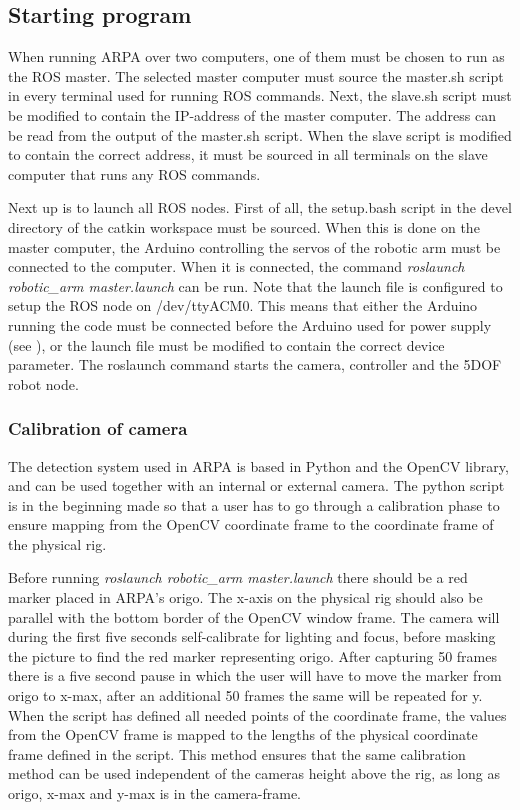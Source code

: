 \documentclass[11pt,a4paper]{report}
\begin{document}
	\subsection{Starting program}
	\label{startup}
	
	When running ARPA over two computers, one of them must be chosen to run as the ROS master. The selected master computer must source the master.sh script in every terminal used for running ROS commands. Next, the slave.sh script must be modified to contain the IP-address of the master computer. The address can be read from the output of the master.sh script. When the slave script is modified to contain the correct address, it must be sourced in all terminals on the slave computer that runs any ROS commands.
	
	Next up is to launch all ROS nodes. First of all, the setup.bash script in the devel directory of the catkin workspace must be sourced. When this is done on the master computer, the Arduino controlling the servos of the robotic arm must be connected to the computer. When it is connected, the command \textit{roslaunch robotic\_arm master.launch} can be run. Note that the launch file is configured to setup the ROS node on /dev/ttyACM0. This means that either the Arduino running the code must be connected before the Arduino used for power supply (see ), or the launch file must be modified to contain the correct device parameter. The roslaunch command starts the camera, controller and the 5DOF robot node. 
	
\subsubsection{Calibration of camera}
The detection system used in ARPA is based in Python and the OpenCV library, and can be used together with an internal or external camera. The python script is in the beginning made so that a user has to go through a calibration phase to ensure mapping from the OpenCV coordinate frame to the coordinate frame of the physical rig.

Before running \textit{roslaunch robotic\_arm master.launch} there should be a red marker placed in ARPA's origo. The x-axis on the physical rig should also be parallel with the bottom border of the OpenCV window frame. The camera will during the first five seconds self-calibrate for lighting and focus, before masking the picture to find the red marker representing origo. After capturing 50 frames there is a five second pause in which the user will have to move the marker from origo to x-max, after an additional 50 frames the same will be repeated for y. When the script has defined all needed points of the coordinate frame, the values from the OpenCV frame is mapped to the lengths of the physical coordinate frame defined in the script. This method ensures that the same calibration method can be used independent of the cameras height above the rig, as long as origo, x-max and y-max is in the camera-frame.
	
\end{document}
